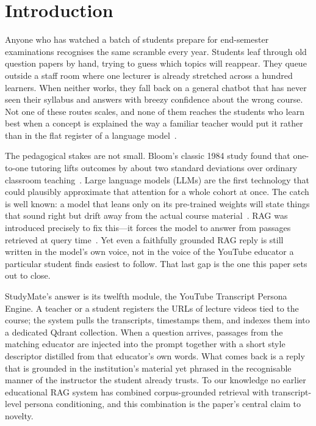 \documentclass[conference]{IEEEtran}
\begin{document}
\section{Introduction}
Anyone who has watched a batch of students prepare for end-semester
examinations recognises the same scramble every year. Students leaf
through old question papers by hand, trying to guess which topics will
reappear. They queue outside a staff room where one lecturer is
already stretched across a hundred learners. When neither works, they
fall back on a general chatbot that has never seen their syllabus and
answers with breezy confidence about the wrong course. Not one of
these routes scales, and none of them reaches the students who learn
best when a concept is explained the way a familiar teacher would put
it rather than in the flat register of a language model~\cite{lauber2025}.

The pedagogical stakes are not small. Bloom's classic 1984 study found
that one-to-one tutoring lifts outcomes by about two standard
deviations over ordinary classroom teaching~\cite{bloom1984}. Large
language models (LLMs) are the first technology that could plausibly
approximate that attention for a whole cohort at once. The catch is
well known: a model that leans only on its pre-trained weights will
state things that sound right but drift away from the actual course
material~\cite{lewis2020}. RAG was introduced precisely to fix
this---it forces the model to answer from passages retrieved at query
time~\cite{lewis2020}. Yet even a faithfully grounded RAG reply is
still written in the model's own voice, not in the voice of the
YouTube educator a particular student finds easiest to follow. That
last gap is the one this paper sets out to close.

StudyMate's answer is its twelfth module, the YouTube Transcript
Persona Engine. A teacher or a student registers the URLs of lecture
videos tied to the course; the system pulls the transcripts, timestamps
them, and indexes them into a dedicated Qdrant collection. When a
question arrives, passages from the matching educator are injected into
the prompt together with a short style descriptor distilled from that
educator's own words. What comes back is a reply that is grounded in
the institution's material yet phrased in the recognisable manner of
the instructor the student already trusts. To our knowledge no earlier
educational RAG system has combined corpus-grounded retrieval with
transcript-level persona conditioning, and this combination is the
paper's central claim to novelty.
\end{document}
